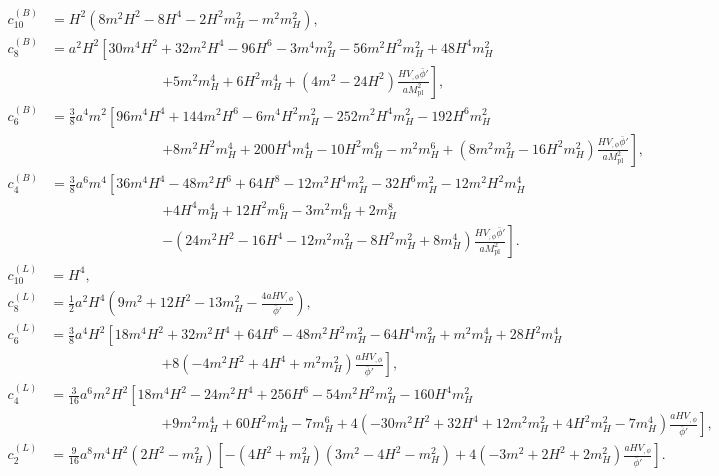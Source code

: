 \documentclass[11pt]{article}
\newcommand{\Mpl}{M_{\mathrm{pl}}}
\begin{document}
\begin{align}
c_{10}^{(B)} &= H^2(8m^2H^2-8H^4-2H^2m_H^2-m^2m_H^2), \\
c_8^{(B)} &=
a^2H^2\left[
30m^4H^2+32m^2H^4-96H^6-3m^4m_H^2-56m^2H^2m_H^2+48H^4m_H^2 \right. \nonumber\\
&\hspace{8em}\left.
+5m^2m_H^4+6H^2m_H^4
+(4m^2-24H^2)\frac{HV_{,\phi}\bar\phi'}{a\Mpl^2}
\right], \\
c_6^{(B)} &=
\frac38a^4m^2\left[
96m^4H^4+144m^2H^6-6m^4H^2m_H^2-252m^2H^4m_H^2-192H^6m_H^2 \right. \nonumber\\
&\hspace{8em}\left.
+8m^2H^2m_H^4+200H^4m_H^4-10H^2m_H^6-m^2m_H^6
+(8m^2m_H^2-16H^2m_H^2)\frac{HV_{,\phi}\bar\phi'}{a\Mpl^2}
\right], \\
c_4^{(B)} &=
\frac38a^6m^4\left[
36m^4H^4-48m^2H^6+64H^8-12m^2H^4m_H^2-32H^6m_H^2
-12m^2H^2m_H^4 \right. \nonumber\\
&\hspace{8em}\left.
+4H^4m_H^4+12H^2m_H^6-3m^2m_H^6+2m_H^8 \right. \nonumber\\
&\hspace{8em}\left.
-(24m^2H^2-16H^4-12m^2m_H^2-8H^2m_H^2+8m_H^4)
\frac{HV_{,\phi}\bar\phi'}{a\Mpl^2}
\right].
\end{align}
\begin{align}
c_{10}^{(L)} &= H^4, \\
c_8^{(L)} &=
\frac12a^2H^4\left(9m^2+12H^2-13m_H^2-\frac{4aHV_{,\phi}}{\bar\phi'}\right), \\
c_6^{(L)} &=
\frac38a^4H^2\left[
18m^4H^2+32m^2H^4+64H^6-48m^2H^2m_H^2-64H^4m_H^2
+m^2m_H^4+28H^2m_H^4 \right. \nonumber\\
&\hspace{8em}\left.
+8(-4m^2H^2+4H^4+m^2m_H^2)\frac{aHV_{,\phi}}{\bar\phi'}
\right], \\
c_4^{(L)} &=
\frac{3}{16}a^6m^2H^2\left[
18m^4H^2-24m^2H^4+256H^6-54m^2H^2m_H^2-160H^4m_H^2 \right. \nonumber\\
&\hspace{8em}\left.
+9m^2m_H^4+60H^2m_H^4-7m_H^6
+4(-30m^2H^2+32H^4+12m^2m_H^2+4H^2m_H^2-7m_H^4)
\frac{aHV_{,\phi}}{\bar\phi'}
\right], \\
c_2^{(L)} &=
\frac{9}{16}a^8m^4H^2(2H^2-m_H^2)
\left[
-(4H^2+m_H^2)(3m^2-4H^2-m_H^2)
+4(-3m^2+2H^2+2m_H^2)\frac{aHV_{,\phi}}{\bar\phi'}
\right].
\end{align}
\end{document}
